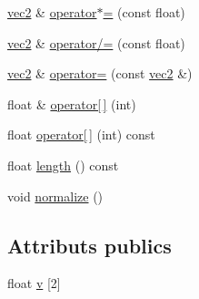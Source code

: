 \begin{DoxyCompactItemize}
\hyperlink{structvec2}{vec2} \& \hyperlink{structvec2_a8710267eaba027c0988ae20d4846519a}{operator$\ast$=} (const float)
\item 
\hyperlink{structvec2}{vec2} \& \hyperlink{structvec2_a2f26ae992debbf688ceb7f433dc757be}{operator/=} (const float)
\item 
\hyperlink{structvec2}{vec2} \& \hyperlink{structvec2_ace53e3484dfb8cf4103c88f0e9fda9e1}{operator=} (const \hyperlink{structvec2}{vec2} \&)
\item 
float \& \hyperlink{structvec2_afd359b332fab435ac2404b7f85b225e0}{operator\mbox{[}$\,$\mbox{]}} (int)
\item 
float \hyperlink{structvec2_a0ffe1784bd89859e97498f09eecb371c}{operator\mbox{[}$\,$\mbox{]}} (int) const 
\item 
float \hyperlink{structvec2_a0858db6efbcc16f47e09de36711988ba}{length} () const 
\item 
void \hyperlink{structvec2_a4b8c6b2e6a7cb804e1cc4211edadbcfa}{normalize} ()
\end{DoxyCompactItemize}
\subsection*{Attributs publics}
\begin{DoxyCompactItemize}
\item 
float \hyperlink{structvec2_ae25758a321e69cf6f722589fca155735}{v} \mbox{[}2\mbox{]}
\end{DoxyCompactItemize}



